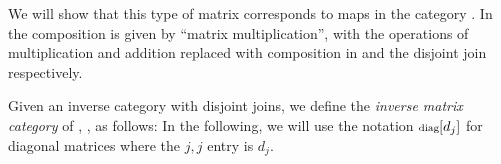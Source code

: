   We will show that this type of matrix corresponds to maps in the category \imatx. In \imatx the
  composition is given by ``matrix multiplication'', with the operations of multiplication and
  addition  replaced with composition in \X and the disjoint join respectively.

\begin{definition}\label{def:inverse_matrix_category}
  Given an inverse category \X with disjoint joins, we define the \emph{inverse
  matrix category} of \X, \imatx, as follows:
  In the following, we will use the notation $\operatorname{\scriptstyle{diag}}[d_j]$ for diagonal matrices where the
  $j,j$ entry is $d_j$.
\end{definition}

